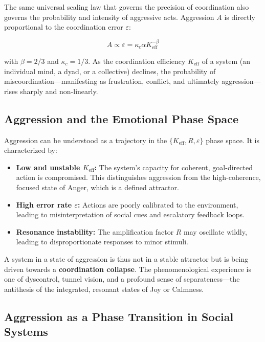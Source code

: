 \documentclass[12pt,a4paper]{article}
\begin{document}
	The same universal scaling law that governs the precision of coordination also governs the probability and intensity of aggressive acts. Aggression \(A\) is directly proportional to the coordination error \(\varepsilon\):
	
	\begin{equation}
		A \propto \varepsilon = \kappa_c \alpha K_{\mathrm{eff}}^{-\beta}
	\end{equation}
	
	with \(\beta = 2/3\) and \(\kappa_c = 1/3\). As the coordination efficiency \(K_{\mathrm{eff}}\) of a system (an individual mind, a dyad, or a collective) declines, the probability of miscoordination—manifesting as frustration, conflict, and ultimately aggression—rises sharply and non-linearly.
	
	\subsection{Aggression and the Emotional Phase Space}
	
	Aggression can be understood as a trajectory in the \(\{K_{\mathrm{eff}}, R, \varepsilon\}\) phase space. It is characterized by:
	
	\begin{itemize}
		\item \textbf{Low and unstable \(K_{\mathrm{eff}}\):} The system's capacity for coherent, goal-directed action is compromised. This distinguishes aggression from the high-coherence, focused state of Anger, which is a defined attractor.
		\item \textbf{High error rate \(\varepsilon\):} Actions are poorly calibrated to the environment, leading to misinterpretation of social cues and escalatory feedback loops.
		\item \textbf{Resonance instability:} The amplification factor \(R\) may oscillate wildly, leading to disproportionate responses to minor stimuli.
	\end{itemize}
	
	A system in a state of aggression is thus not in a stable attractor but is being driven towards a \textbf{coordination collapse}. The phenomenological experience is one of dyscontrol, tunnel vision, and a profound sense of separateness—the antithesis of the integrated, resonant states of Joy or Calmness.
	
	\subsection{Aggression as a Phase Transition in Social Systems}
	
\end{document}

